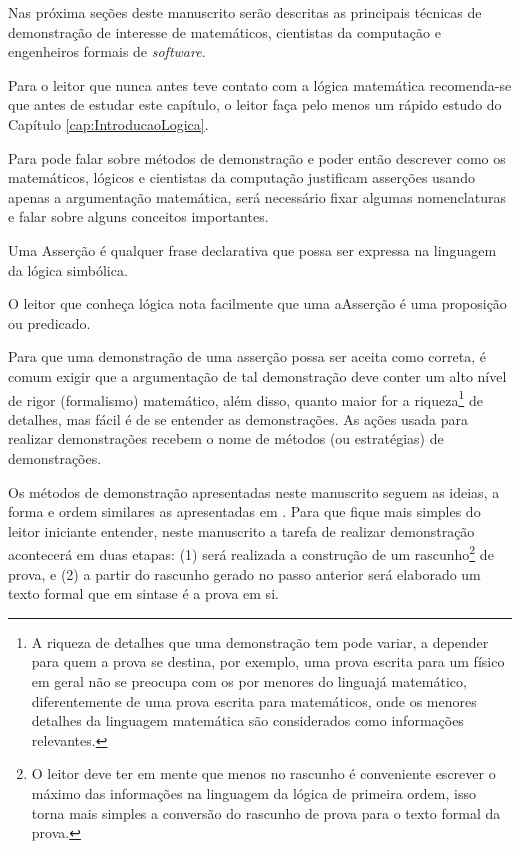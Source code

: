 Nas próxima seções deste manuscrito serão descritas as principais técnicas de demonstração de interesse de matemáticos, cientistas da computação e engenheiros formais de \textit{software}. 

\begin{remark}
	Para o leitor que nunca antes teve contato com a lógica matemática recomenda-se que antes de estudar este capítulo, o leitor faça pelo menos um rápido estudo do Capítulo \ref{cap:IntroducaoLogica}.
\end{remark}

Para pode falar sobre métodos de demonstração e poder então descrever como os matemáticos, lógicos e cientistas da computação justificam asserções usando apenas a argumentação matemática, será necessário fixar algumas nomenclaturas e falar sobre alguns conceitos importantes.

\begin{definition}[Asserção]\label{def:Assercao}
	Uma Asserção é qualquer frase declarativa que possa ser expressa na linguagem da lógica simbólica.
\end{definition}

\begin{remark}
	O leitor que conheça lógica nota facilmente que uma aAsserção é uma proposição ou predicado.
\end{remark}

Para que uma demonstração de uma asserção possa ser aceita como correta, é comum exigir que a argumentação de tal demonstração deve conter um alto nível de rigor (formalismo) matemático, além disso, quanto maior for a riqueza\footnote{A riqueza de detalhes que uma demonstração tem pode variar, a depender para quem a prova se destina, por exemplo, uma prova escrita para um físico em geral não se preocupa com os por menores do linguajá matemático, diferentemente de uma prova escrita para matemáticos, onde os menores detalhes da linguagem matemática são considerados como informações relevantes.} de detalhes, mas fácil é de se entender as demonstrações. As ações usada para realizar demonstrações recebem o nome de métodos (ou estratégias) de demonstrações.

Os métodos de demonstração apresentadas neste manuscrito seguem as ideias, a forma e ordem similares as apresentadas em \cite{velleman2019comProvar}. Para que fique mais simples do leitor iniciante entender, neste manuscrito a tarefa de realizar demonstração acontecerá em duas etapas: (1) será realizada a construção de um rascunho\footnote{O leitor deve ter em mente que menos no rascunho é conveniente escrever o máximo das informações na linguagem da lógica de primeira ordem, isso torna mais simples a conversão do rascunho de prova para o texto formal da prova.} de prova, e (2) a partir do rascunho gerado no passo anterior será elaborado um texto formal que em sintase é a prova em si.


